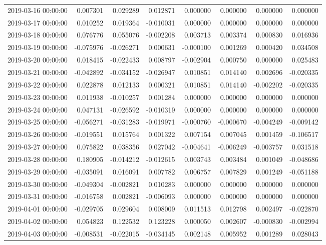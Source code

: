 \begin{tabular}{lrrrrrrr}
2019-03-16 00:00:00 & 0.007301 & 0.029289 & 0.012871 & 0.000000 & 0.000000 & 0.000000 & 0.000000 \\
2019-03-17 00:00:00 & 0.010252 & 0.019364 & -0.010031 & 0.000000 & 0.000000 & 0.000000 & 0.000000 \\
2019-03-18 00:00:00 & 0.076776 & 0.055076 & -0.002208 & 0.003713 & 0.003374 & 0.000830 & 0.016936 \\
2019-03-19 00:00:00 & -0.075976 & -0.026271 & 0.000631 & -0.000100 & 0.001269 & 0.000420 & 0.034508 \\
2019-03-20 00:00:00 & 0.018415 & -0.022433 & 0.008797 & -0.002904 & 0.000750 & 0.000000 & 0.025483 \\
2019-03-21 00:00:00 & -0.042892 & -0.034152 & -0.026947 & 0.010851 & 0.014140 & 0.002696 & -0.020335 \\
2019-03-22 00:00:00 & 0.022878 & 0.012133 & 0.000321 & 0.010851 & 0.014140 & -0.002202 & -0.020335 \\
2019-03-23 00:00:00 & 0.011938 & -0.010257 & 0.001284 & 0.000000 & 0.000000 & 0.000000 & 0.000000 \\
2019-03-24 00:00:00 & 0.047131 & -0.026592 & -0.010319 & 0.000000 & 0.000000 & 0.000000 & 0.000000 \\
2019-03-25 00:00:00 & -0.056271 & -0.031283 & -0.019971 & -0.000760 & -0.000670 & -0.004249 & -0.009142 \\
2019-03-26 00:00:00 & -0.019551 & 0.015764 & 0.001322 & 0.007154 & 0.007045 & 0.001459 & -0.106517 \\
2019-03-27 00:00:00 & 0.075822 & 0.038356 & 0.027042 & -0.004641 & -0.006249 & -0.003757 & 0.031518 \\
2019-03-28 00:00:00 & 0.180905 & -0.014212 & -0.012615 & 0.003743 & 0.003484 & 0.001049 & -0.048686 \\
2019-03-29 00:00:00 & -0.035091 & 0.016091 & 0.007782 & 0.006757 & 0.007829 & 0.001249 & -0.051188 \\
2019-03-30 00:00:00 & -0.049304 & -0.002821 & 0.010283 & 0.000000 & 0.000000 & 0.000000 & 0.000000 \\
2019-03-31 00:00:00 & -0.016758 & 0.002821 & -0.006093 & 0.000000 & 0.000000 & 0.000000 & 0.000000 \\
2019-04-01 00:00:00 & -0.029705 & 0.029604 & 0.008009 & 0.011513 & 0.012798 & 0.002497 & -0.022870 \\
2019-04-02 00:00:00 & 0.054823 & 0.122532 & 0.123228 & 0.000050 & 0.002607 & -0.000830 & -0.002994 \\
2019-04-03 00:00:00 & -0.008531 & -0.022015 & -0.034145 & 0.002148 & 0.005952 & 0.001289 & 0.028043 \\

\end{tabular}
